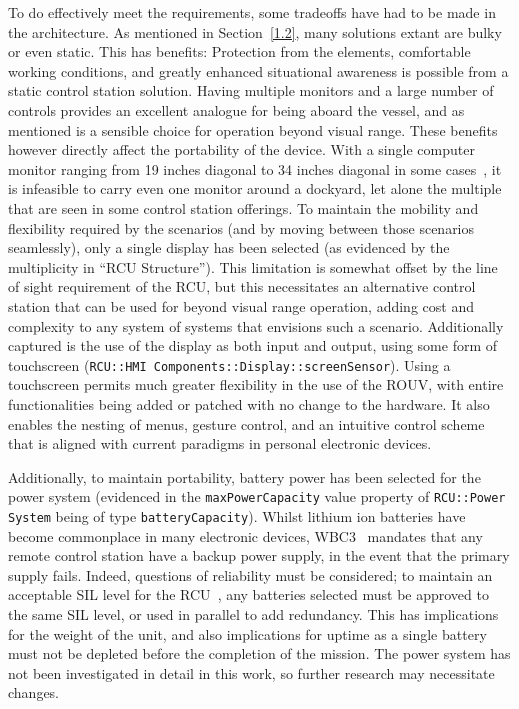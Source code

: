 \documentclass[../main.tex]{subfiles}
\begin{document}
To do effectively meet the requirements, some tradeoffs have had to be made in the architecture.
As mentioned in Section~\ref{1.2}, many solutions extant are bulky or even static.
This has benefits: Protection from the elements, comfortable working conditions, and greatly enhanced situational awareness is possible from a static control station solution.
Having multiple monitors and a large number of controls provides an excellent analogue for being aboard the vessel, and as mentioned is a sensible choice for operation beyond visual range.
These benefits however directly affect the portability of the device.
With a single computer monitor ranging from 19 inches diagonal to 34 inches diagonal in some cases~\cite{Knerl2024}, it is infeasible to carry even one monitor around a dockyard, let alone the multiple that are seen in some control station offerings.
To maintain the mobility and flexibility required by the scenarios (and by moving between those scenarios seamlessly), only a single display has been selected (as evidenced by the multiplicity in ``RCU Structure'').
This limitation is somewhat offset by the line of sight requirement of the RCU, but this necessitates an alternative control station that can be used for beyond visual range operation, adding cost and complexity to any system of systems that envisions such a scenario.
Additionally captured is the use of the display as both input and output, using some form of touchscreen (\texttt{RCU::HMI Components::Display::screenSensor}).
Using a touchscreen permits much greater flexibility in the use of the ROUV, with entire functionalities being added or patched with no change to the hardware.
It also enables the nesting of menus, gesture control, and an intuitive control scheme that is aligned with current paradigms in personal electronic devices.

Additionally, to maintain portability, battery power has been selected for the power system (evidenced in the \texttt{maxPowerCapacity} value property of \texttt{RCU::Power System} being of type \texttt{batteryCapacity}).
Whilst lithium ion batteries have become commonplace in many electronic devices, WBC3~\cite{WBC3} mandates that any remote control station have a backup power supply, in the event that the primary supply fails.
Indeed, questions of reliability must be considered; to maintain an acceptable SIL level for the RCU~\cite{IEC61508}, any batteries selected must be approved to the same SIL level, or used in parallel to add redundancy.
This has implications for the weight of the unit, and also implications for uptime as a single battery must not be depleted before the completion of the mission.
The power system has not been investigated in detail in this work, so further research may necessitate changes.
\end{document}
